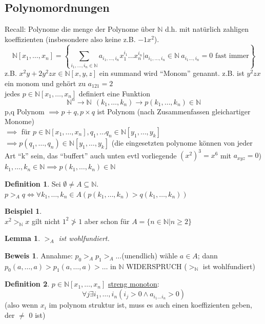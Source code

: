 \documentclass{article}
\newtheorem{lemma}{Lemma}[section]
\theoremstyle{definition}
\newtheorem{beweis}{Beweis}[section]
\newtheorem{beispiel}{Beispiel}[section]
\newtheorem{definition}{Definition}[section]
\begin{document}
	\subsection{Polynomordnungen}
	Recall: Polynome die menge der Polynome über $\mathbb{N}$ d.h. mit natürlich zahligen koeffizienten (insbesondere also keine z.B. $-1x^2$).\\
	\[\mathbb{N}[x_1,\dots,x_n] = \left\{\sum_{i_1,\dots,i_n\in\mathbb{N}} a_{i_1,\dots,i_n}x_1^{i_1}\dots x^{i_n}_n|a_{i_1,\dots,i_n}\in\mathbb{N}\ a_{i_1\dots,i_n} =0 \text{ fast immer}\right\}\]
	z.B. $x^2y+2y^2zx\in\mathbb{N}[x,y,z]$ ein summand wird ``Monom'' genannt. z.B. ist $y^2zx$ ein monom und gehört zu $a_{121}=2$\\
	jedes $p\in\mathbb{N}[x_1,\dots,x_n]$ definiert eine Funktion 
	\[\mathbb{N}^n\to \mathbb{N}\ \ (k_1,\dots,k_n)\to p(k_1,\dots,k_n)\in\mathbb{N}\]
	p,q Polynom $\implies p+q, p\times q$ ist Polynom (nach Zusammenfassen gleichartiger Monome)\\
	$\implies$ für $p\in \mathbb{N}[x_1,\dots,x_n], q_1,\dots q_n\in\mathbb{N}[y_1,\dots,y_k]$\\
	$\implies p(q_1,\dots,q_n)\in\mathbb{N}[y_1,\dots, y_k]$ (die eingesetzten polynome können von jeder Art ``k'' sein, das ``buffert'' auch unten evtl vorliegende $(x^2)^3=x^6$ mit $a_{xyz}=0$)\\
	$k_1,\dots,k_n\in\mathbb{N} \implies p(k_1,\dots, k_n)\in\mathbb{N}$\\
	\begin{definition} Sei $\emptyset\neq A\subseteq\mathbb{N}$.\\
	$p>_A q\iff \forall k_1,\dots,k_n\in A (p(k_1,\dots,k_n)>q(k_1,\dots,k_n))$
	\end{definition}
	\begin{beispiel}\ \\
	$x^2>_\mathbb{N} x$ gilt nicht $1^2\ngtr 1$ aber schon für $A=\{n\in\mathbb{N}|n\geq 2\}$\end{beispiel}
	\begin{lemma}
	$>_A$ ist wohlfundiert.
	\end{lemma}
	\begin{beweis} Annahme: $p_0>_A p_1>_A\dots$(unendlich)
	wähle $a\in A$; dann $p_0(a,\dots, a)>p_1(a,\dots, a)>\dots$ in $\mathbb{N}$ WIDERSPRUCH ($>_\mathbb{N}$ ist wohlfundiert)
	\end{beweis}
	\begin{definition} $p\in\mathbb{N}[x_1,\dots, x_n]$ \underline{streng monoton}:\\
	\[\forall j\exists i_1,\dots,i_n (i_j>0\land a_{i_1\dots i_n}>0)\]
	(also  wenn $x_i$ im polynom struktur ist, muss es auch einen koeffizienten geben, der $\neq$ 0 ist)
	\end{definition}
\end{document}
